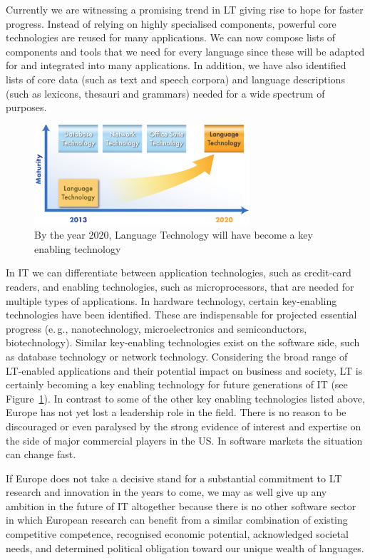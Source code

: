 \documentclass[10pt, plain]{../../metanetpaper}
\begin{document}
\begin{multicols}{2}
Currently we are witnessing a promising trend in LT giving rise to hope for faster progress. Instead of relying on highly specialised components, powerful core technologies are reused for many applications. We can now compose lists of components and tools that we need for every language since these will be adapted for and integrated into many applications. In addition, we have also identified lists of core data (such as text and speech corpora) and language descriptions (such as lexicons, thesauri and grammars) needed for a wide spectrum of purposes.

\begin{figure}[htb]
  \center
  \includegraphics[width=0.71\textwidth]{../_media/LT-maturity.pdf}
  \caption{By the year 2020, Language Technology will have become a key enabling technology}
  \label{fig:lt-in-2020}
\end{figure}

In IT we can differentiate between application technologies, such as credit-card readers, and enabling technologies, such as microprocessors, that are needed for multiple types of applications. In hardware technology, certain key-enabling technologies have been identified. These are indispensable for projected essential progress (e.\,g., nanotechnology, microelectronics and semiconductors, biotechnology). Similar key-enabling technologies exist on the software side, such as database technology or network technology. Considering the broad range of LT-enabled applications and their potential impact on business and society, LT is certainly becoming a key enabling technology for future generations of IT (see Figure~\ref{fig:lt-in-2020}). In contrast to some of the other key enabling technologies listed above, Europe has not yet lost a leadership role in the field. There is no reason to be discouraged or even paralysed by the strong evidence of interest and expertise on the side of major commercial players in the US. In software markets the situation can change fast.

If Europe does not take a decisive stand for a substantial commitment to LT research and innovation in the years to come, we may as well give up any ambition in the future of IT altogether because there is no other software sector in which European research can benefit from a similar combination of existing competitive competence, recognised economic potential, acknowledged societal needs, and determined political obligation toward our unique wealth of languages.
\end{multicols}
\end{document}
